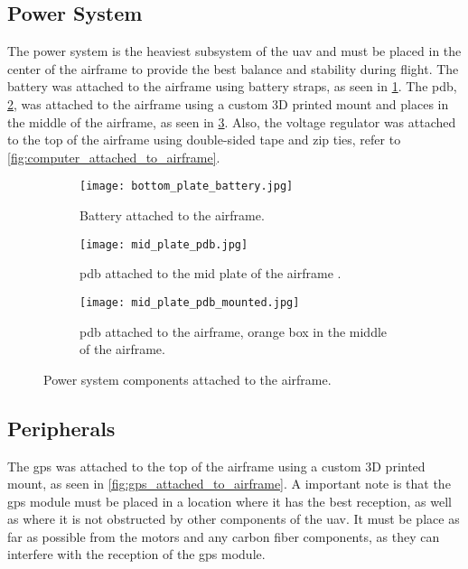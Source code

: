 \subsection{Power System}\label{subsec:implementation_power_system}

The power system is the heaviest subsystem of the \gls{uav} and must be placed in the center of the airframe to provide the best balance and stability during flight. The battery was attached to the airframe using battery straps, as seen in \cref{fig:battery_attached_to_airframe}. The \gls{pdb}, \cref{fig:pdb}, was attached to the airframe using a custom 3D printed mount and places in the middle of the airframe, as seen in \cref{fig:power_distribution_board_attached_to_airframe}. Also, the voltage regulator was attached to the top of the airframe using double-sided tape and zip ties, refer to \cref{fig:computer_attached_to_airframe}.

\begin{figure}
  \hfill
  \begin{subfigure}[t]{0.3\linewidth}
    \texttt{[image: bottom\_plate\_battery.jpg]}
    \caption{Battery attached to the airframe.}\label{fig:battery_attached_to_airframe}
  \end{subfigure}
  \hfill
  \begin{subfigure}[t]{0.3\linewidth}
    \texttt{[image: mid\_plate\_pdb.jpg]}
    \caption{\gls{pdb} attached to the mid plate of the airframe \autocite{developingcosteffectivedrones5g}.}\label{fig:pdb}
  \end{subfigure}
  \hfill
  \begin{subfigure}[t]{0.3\linewidth}
    \texttt{[image: mid\_plate\_pdb\_mounted.jpg]}
    \caption{\gls{pdb} attached to the airframe, orange box in the middle of the airframe.}\label{fig:power_distribution_board_attached_to_airframe}
  \end{subfigure}
  \hfill

  \caption{Power system components attached to the airframe.}\label{fig:power_system_components_attached_to_airframe}
\end{figure}

\subsection{Peripherals}\label{subsec:implementation_peripherals}

The \gls{gps} was attached to the top of the airframe using a custom 3D printed mount, as seen in \cref{fig:gps_attached_to_airframe}. A important note is that the \gls{gps} module must be placed in a location where it has the best reception, as well as where it is not obstructed by other components of the \gls{uav}. It must be place as far as possible from the motors and any carbon fiber components, as they can interfere with the reception of the \gls{gps} module.

